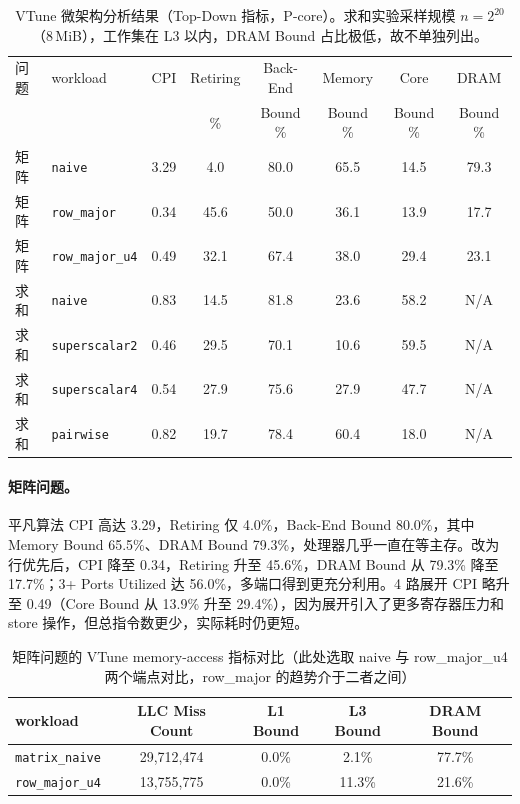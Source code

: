 \documentclass[a4paper,11pt,UTF8]{ctexart}
\begin{document}
\begin{table}[H]
  \centering\scriptsize
  \begin{tabular}{llcccccc}
    \toprule
    问题 & workload & CPI & Retiring & Back-End & Memory & Core & DRAM \\
    &          &     & \%       & Bound \% & Bound \% & Bound \% & Bound \% \\
    \midrule
    矩阵 & \texttt{naive}       & 3.29  & 4.0  & 80.0 & 65.5 & 14.5 & 79.3 \\
    矩阵 & \texttt{row\_major}  & 0.34  & 45.6 & 50.0 & 36.1 & 13.9 & 17.7 \\
    矩阵 & \texttt{row\_major\_u4} & 0.49 & 32.1 & 67.4 & 38.0 & 29.4 & 23.1 \\
    求和 & \texttt{naive}       & 0.83  & 14.5 & 81.8 & 23.6 & 58.2 & N/A \\
    求和 & \texttt{superscalar2}& 0.46  & 29.5 & 70.1 & 10.6 & 59.5 & N/A \\
    求和 & \texttt{superscalar4}& 0.54  & 27.9 & 75.6 & 27.9 & 47.7 & N/A \\
    求和 & \texttt{pairwise}    & 0.82  & 19.7 & 78.4 & 60.4 & 18.0 & N/A \\
    \bottomrule
  \end{tabular}
  \caption{VTune 微架构分析结果（Top-Down 指标，P-core）。求和实验采样规模 $n=2^{20}$（8\,MiB），工作集在 L3 以内，DRAM Bound 占比极低，故不单独列出。}
  \label{tab:vtune_full}
\end{table}

\paragraph{矩阵问题。}
平凡算法 CPI 高达 3.29，Retiring 仅 4.0\%，Back-End Bound 80.0\%，其中 Memory Bound 65.5\%、DRAM Bound 79.3\%，处理器几乎一直在等主存。改为行优先后，CPI 降至 0.34，Retiring 升至 45.6\%，DRAM Bound 从 79.3\% 降至 17.7\%；3+ Ports Utilized 达 56.0\%，多端口得到更充分利用。4 路展开 CPI 略升至 0.49（Core Bound 从 13.9\% 升至 29.4\%），因为展开引入了更多寄存器压力和 store 操作，但总指令数更少，实际耗时仍更短。

\begin{table}[H]
  \centering\scriptsize
  \begin{tabular}{lcccc}
    \toprule
    workload & LLC Miss Count & L1 Bound & L3 Bound & DRAM Bound \\
    \midrule
    \texttt{matrix\_naive} & 29{,}712{,}474 & 0.0\% & 2.1\% & 77.7\% \\
    \texttt{row\_major\_u4} & 13{,}755{,}775 & 0.0\% & 11.3\% & 21.6\% \\
    \bottomrule
  \end{tabular}
  \caption{矩阵问题的 VTune memory-access 指标对比（此处选取 naive 与 row\_major\_u4 两个端点对比，row\_major 的趋势介于二者之间）}
  \label{tab:vtune_mem_matrix}
\end{table}
\end{document}
